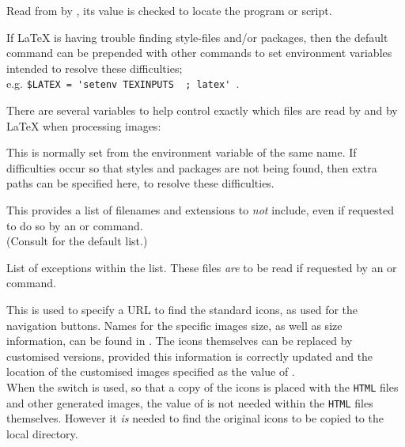 \begin{htmllist}
\item [\fn{\$LATEX}\texttt{ = 'latex';}]
Read from  by , 
its value is checked to locate the  program or script.

\smallskip\noindent
If \LaTeX{} is having trouble finding style-files and/or packages, then
the default command can be prepended with other commands 
to set environment variables intended to resolve these difficulties;\\
e.g. 
\verb|$LATEX = 'setenv TEXINPUTS |\verb| ; latex' |.

There are several variables to help control exactly which files are
read by \latextohtml{} and by \LaTeX{} when processing images:

\begin{htmllist}%
\item [\fn{\$TEXINPUTS}]
This is normally set from the environment variable of the same name.
If difficulties occur so that styles and packages are not being found, 
then extra paths can be specified here, to resolve these difficulties.

\item [\fn{\$DONT\_INCLUDE}]
This provides a list of filenames and extensions to \emph{not} include, 
even if requested to do so by an  or  command.\\
(Consult  for the default list.)

\item [\fn{\$DO\_INCLUDE}\texttt{ = '';}]
List of exceptions within the  list.
These files \emph{are} to be read if requested by an 
or  command.
\end{htmllist}


\item [\fn{\$ICONSERVER}\texttt{ = '\Meta{URL}';}]
This is used to specify a URL to find the standard icons, as used for the
navigation buttons.\html{\\}
Names for the specific images size, as well as size information, 
can be found in . The icons themselves can be replaced
by customised versions, provided this information is correctly updated
and the location of the customised images specified as the value
of .\\
When the  switch is used,
so that a copy of the icons is placed with the \texttt{HTML} files and other
generated images, the value of  is not needed within
the \texttt{HTML} files themselves. However it \emph{is} needed to find
the original icons to be copied to the local directory.


\end{htmllist}

